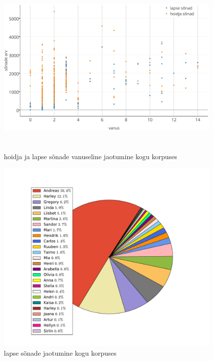 \documentclass[12pt]{article}
\begin{document}

\begin{figure}[H]
    \centering
    \includegraphics[width=\textwidth, height=9cm]{lindistused_vanus_sonad_crop}
    \caption{hoidja ja lapse sõnade vanuseline jaotumine kogu korpuses}
\end{figure}


\begin{figure}[H]
    \centering
    \includegraphics[width=\textwidth]{lapse_sonad_kogu_korpus}
    \caption{lapse sõnade jaotumine kogu korpuses}
\end{figure}
\end{document}
